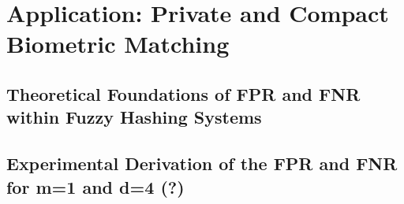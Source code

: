 \section{Application: Private and Compact Biometric Matching}

\subsection{Theoretical Foundations of FPR and FNR within Fuzzy Hashing Systems}

\subsection{Experimental Derivation of the FPR and FNR for m=1 and d=4 (?)}